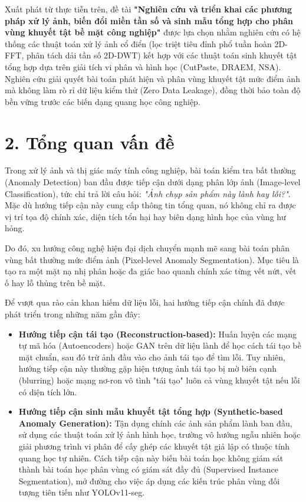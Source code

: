 Xuất phát từ thực tiễn trên, đề tài \textbf{"Nghiên cứu và triển khai các phương pháp xử lý ảnh, biến đổi miền tần số và sinh mẫu tổng hợp cho phân vùng khuyết tật bề mặt công nghiệp"} được lựa chọn nhằm nghiên cứu có hệ thống các thuật toán xử lý ảnh cổ điển (lọc triệt tiêu đỉnh phổ tuần hoàn 2D-FFT, phân tách dải tần số 2D-DWT) kết hợp với các thuật toán sinh khuyết tật tổng hợp dựa trên giải tích vi phân và hình học (CutPaste, DRAEM, NSA). Nghiên cứu giải quyết bài toán phát hiện và phân vùng khuyết tật mức điểm ảnh mà không làm rò rỉ dữ liệu kiểm thử (Zero Data Leakage), đồng thời bảo toàn độ bền vững trước các biến dạng quang học công nghiệp.

\section*{2. Tổng quan vấn đề}

Trong xử lý ảnh và thị giác máy tính công nghiệp, bài toán kiểm tra bất thường (Anomaly Detection) ban đầu được tiếp cận dưới dạng phân lớp ảnh (Image-level Classification), tức chỉ trả lời câu hỏi: \textit{"Ảnh chụp sản phẩm này lành hay lỗi?"}. Mặc dù hướng tiếp cận này cung cấp thông tin tổng quan, nó không chỉ ra được vị trí tọa độ chính xác, diện tích tổn hại hay biên dạng hình học của vùng hư hỏng.

Do đó, xu hướng công nghệ hiện đại dịch chuyển mạnh mẽ sang bài toán phân vùng bất thường mức điểm ảnh (Pixel-level Anomaly Segmentation). Mục tiêu là tạo ra một mặt nạ nhị phân hoặc đa giác bao quanh chính xác từng vết nứt, vết ố hay lỗ thủng trên bề mặt.

Để vượt qua rào cản khan hiếm dữ liệu lỗi, hai hướng tiếp cận chính đã được phát triển trong những năm gần đây:
\begin{itemize}
    \item \textbf{Hướng tiếp cận tái tạo (Reconstruction-based):} Huấn luyện các mạng tự mã hóa (Autoencoders) hoặc GAN trên dữ liệu lành để học cách tái tạo bề mặt chuẩn, sau đó trừ ảnh đầu vào cho ảnh tái tạo để tìm lỗi. Tuy nhiên, hướng tiếp cận này thường gặp hiện tượng ảnh tái tạo bị mờ biên cạnh (blurring) hoặc mạng nơ-ron vô tình "tái tạo" luôn cả vùng khuyết tật nếu lỗi có diện tích lớn.
    \item \textbf{Hướng tiếp cận sinh mẫu khuyết tật tổng hợp (Synthetic-based Anomaly Generation):} Tận dụng chính các ảnh sản phẩm lành ban đầu, sử dụng các thuật toán xử lý ảnh hình học, trường vô hướng ngẫu nhiên hoặc giải phương trình vi phân để cấy ghép các khuyết tật giả lập có thuộc tính quang học tự nhiên. Cách tiếp cận này biến bài toán học không giám sát thành bài toán học phân vùng có giám sát đầy đủ (Supervised Instance Segmentation), mở đường cho việc áp dụng các kiến trúc phân vùng đối tượng tiên tiến như YOLOv11-seg.
\end{itemize}

